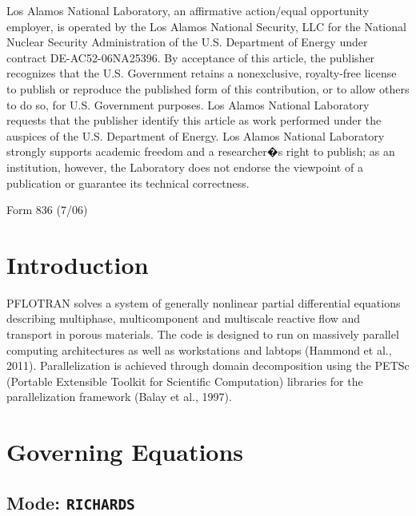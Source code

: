 \documentclass[12pt]{article}
\begin{document}
\vspace{-6pt}

\noindent
\scriptsize
Los Alamos National Laboratory, an affirmative action/equal opportunity employer, is operated by the Los Alamos National Security, LLC
for the National Nuclear Security Administration of the U.S. Department of Energy under contract DE-AC52-06NA25396. By acceptance
of this article, the publisher recognizes that the U.S. Government retains a nonexclusive, royalty-free license to publish or reproduce the
published form of this contribution, or to allow others to do so, for U.S. Government purposes. Los Alamos National Laboratory requests
that the publisher identify this article as work performed under the auspices of the U.S. Department of Energy. Los Alamos National
Laboratory strongly supports academic freedom and a researcher�s right to publish; as an institution, however, the Laboratory does not
endorse the viewpoint of a publication or guarantee its technical correctness.

\hfill Form 836 (7/06)

\normalsize

\clearpage

\tableofcontents



\clearpage

\section{Introduction}

PFLOTRAN solves a system of generally nonlinear partial differential equations describing multiphase, multicomponent and multiscale reactive flow and transport in porous materials. The code is designed to run on massively parallel computing architectures as well as workstations and labtops (Hammond et al., 2011). Parallelization is achieved through domain decomposition using the PETSc (Port\-a\-ble Extensible Toolkit for Scientific Computation) libraries for the parallelization framework  (Balay et al., 1997).

\section{Governing Equations}

\subsection{Mode: {\tt RICHARDS}}
\end{document}
